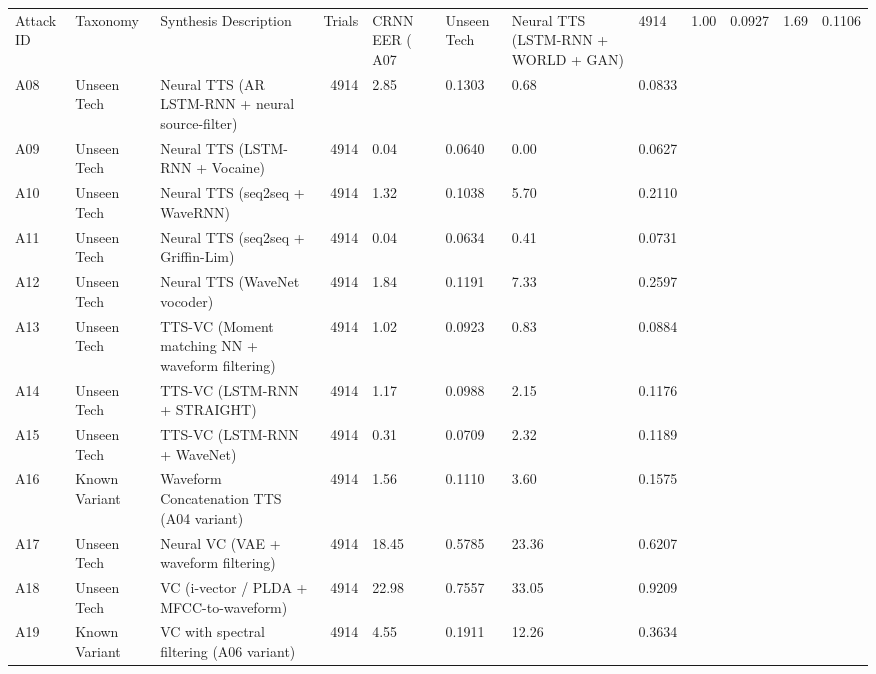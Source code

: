 \begin{tabular}{lllrllll}
\toprule
Attack ID & Taxonomy & Synthesis Description & Trials & CRNN EER (%
\midrule
A07 & Unseen Tech & Neural TTS (LSTM-RNN + WORLD + GAN) & 4914 & 1.00 & 0.0927 & 1.69 & 0.1106 \\
A08 & Unseen Tech & Neural TTS (AR LSTM-RNN + neural source-filter) & 4914 & 2.85 & 0.1303 & 0.68 & 0.0833 \\
A09 & Unseen Tech & Neural TTS (LSTM-RNN + Vocaine) & 4914 & 0.04 & 0.0640 & 0.00 & 0.0627 \\
A10 & Unseen Tech & Neural TTS (seq2seq + WaveRNN) & 4914 & 1.32 & 0.1038 & 5.70 & 0.2110 \\
A11 & Unseen Tech & Neural TTS (seq2seq + Griffin-Lim) & 4914 & 0.04 & 0.0634 & 0.41 & 0.0731 \\
A12 & Unseen Tech & Neural TTS (WaveNet vocoder) & 4914 & 1.84 & 0.1191 & 7.33 & 0.2597 \\
A13 & Unseen Tech & TTS-VC (Moment matching NN + waveform filtering) & 4914 & 1.02 & 0.0923 & 0.83 & 0.0884 \\
A14 & Unseen Tech & TTS-VC (LSTM-RNN + STRAIGHT) & 4914 & 1.17 & 0.0988 & 2.15 & 0.1176 \\
A15 & Unseen Tech & TTS-VC (LSTM-RNN + WaveNet) & 4914 & 0.31 & 0.0709 & 2.32 & 0.1189 \\
A16 & Known Variant & Waveform Concatenation TTS (A04 variant) & 4914 & 1.56 & 0.1110 & 3.60 & 0.1575 \\
A17 & Unseen Tech & Neural VC (VAE + waveform filtering) & 4914 & 18.45 & 0.5785 & 23.36 & 0.6207 \\
A18 & Unseen Tech & VC (i-vector / PLDA + MFCC-to-waveform) & 4914 & 22.98 & 0.7557 & 33.05 & 0.9209 \\
A19 & Known Variant & VC with spectral filtering (A06 variant) & 4914 & 4.55 & 0.1911 & 12.26 & 0.3634 \\
\bottomrule
\end{tabular}
